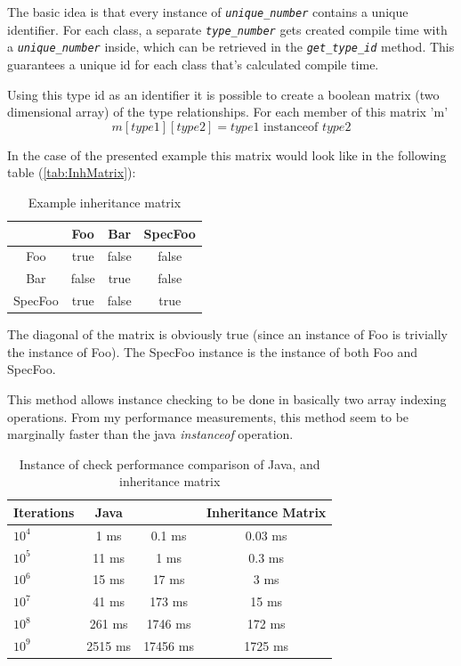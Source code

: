 The basic idea is that every instance of \emph{\texttt{unique\_number}} contains
a unique identifier. For each class, a separate \emph{\texttt{type\_number}}
gets created compile time with a \emph{\texttt{unique\_number}} inside, which can be
retrieved in the \emph{\texttt{get\_type\_id}} method. This guarantees a unique
id for each class that's calculated compile time.

Using this type id as an identifier it is possible to create a boolean matrix
(two dimensional array) of the type relationships. For each member of this matrix
'm' 
\[
m[type1][type2] = type1\textrm{ instanceof }type2
\]

In the case of the presented example this matrix would look like in the
following table (\ref{tab:InhMatrix}):

\begin{table}[ht]
	\footnotesize
	\centering
	\caption{Example inheritance matrix}\label{tab:InhMatrix}
	\begin{tabular}{| c | c | c | c |}
	\hline
			& Foo	& Bar	& SpecFoo	\\ \hline
	Foo		& true	& false	& false		\\ \hline
	Bar		& false	& true	& false		\\ \hline
	SpecFoo	& true	& false	& true		\\ \hline
	
	\hline
	\end{tabular}
	\label{tab:TabularExample}
\end{table}

The diagonal of the matrix is obviously true (since an instance of Foo is
trivially the instance of Foo). The SpecFoo instance is the instance of both Foo
and SpecFoo.

This method allows instance checking to be done in basically two array indexing
operations. From my performance measurements, this method seem to be marginally
faster than the java \emph{instanceof} operation.

\begin{table}[ht]
	\footnotesize
	\centering
	\caption{Instance of check performance comparison of Java,
	\CPP{} and inheritance matrix}\label{tab:InstPerf}
	\begin{tabular}{ | l | c | c | c |}
	\hline
	Iterations 	& Java 		& \CPP{}	&	Inheritance Matrix	\\ \hline
	$10^4$ 		&  1	ms 	& 0.1	ms	&	0.03	ms			\\
	$10^5$ 		&  11 	ms  & 1		ms	&	0.3		ms			\\
	$10^6$ 		&  15 	ms  & 17	ms	&	3		ms			\\
	$10^7$ 		&  41 	ms  & 173	ms	&	15		ms			\\
	$10^8$ 		&  261 	ms  & 1746	ms	&	172		ms			\\
	$10^9$ 		&  2515 ms  & 17456	ms	&	1725	ms			\\
	\hline
	\end{tabular}
	\label{tab:TabularExample}
\end{table}

